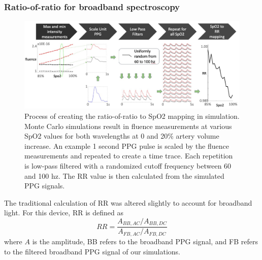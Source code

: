 \subsubsection{Ratio-of-ratio for broadband spectroscopy}
\begin{figure}
    \begin{center}
    \includegraphics[width=\textwidth]{fig/moxi/D3process.pdf}
    \end{center}
    \caption{Process of creating the ratio-of-ratio to SpO2 mapping in simulation. Monte Carlo simulations result in fluence measurements at various SpO2 values for both wavelengths at 0 and 20\% artery volume increase. An example 1 second PPG pulse is scaled by the fluence measurements and repeated to create a time trace. Each repetition is low-pass filtered with a randomized cutoff frequency between 60 and 100 hz. The RR value is then calculated from the simulated PPG signals.} 
    \label{fig:D3process}
\end{figure} 
The traditional calculation of RR was altered slightly to account for broadband light. For this device, RR is defined as 
\begin{equation} \label{eq:RRbroadband}
    RR = \frac{ A_{BB,AC}/A_{BB,DC} }{ A_{FB,AC}/A_{FB,DC} }
\end{equation}
where $A$ is the amplitude, BB refers to the broadband PPG signal, and FB refers to the filtered broadband PPG signal of our simulations. 
        
